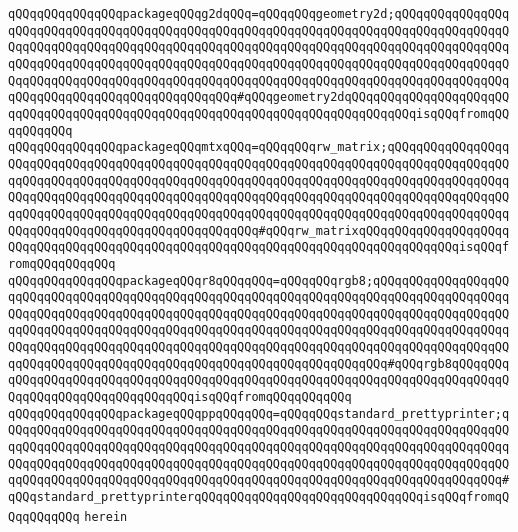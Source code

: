 \verb|qQQqqQQqqQQqqQQqpackageqQQqg2dqQQq=qQQqqQQqgeometry2d;qQQqqQQqqQQqqQQqqQQqqQQqqQQqqQQqqQQqqQQqqQQqqQQqqQQqqQQqqQQqqQQqqQQqqQQqqQQqqQQqqQQqqQQqqQQqqQQqqQQqqQQqqQQqqQQqqQQqqQQqqQQqqQQqqQQqqQQqqQQqqQQqqQQqqQQqqQQqqQQqqQQqqQQqqQQqqQQqqQQqqQQqqQQqqQQqqQQqqQQqqQQqqQQqqQQqqQQqqQQqqQQqqQQqqQQqqQQqqQQqqQQqqQQqqQQqqQQqqQQqqQQqqQQqqQQqqQQqqQQqqQQqqQQqqQQqqQQqqQQqqQQqqQQqqQQqqQQqqQQqqQQqqQQq#qQQqgeometry2dqQQqqQQqqQQqqQQqqQQqqQQqqQQqqQQqqQQqqQQqqQQqqQQqqQQqqQQqqQQqqQQqqQQqqQQqqQQqqQQqisqQQqfromqQQqqQQqqQQq|\newline
\verb|qQQqqQQqqQQqqQQqpackageqQQqmtxqQQq=qQQqqQQqrw_matrix;qQQqqQQqqQQqqQQqqQQqqQQqqQQqqQQqqQQqqQQqqQQqqQQqqQQqqQQqqQQqqQQqqQQqqQQqqQQqqQQqqQQqqQQqqQQqqQQqqQQqqQQqqQQqqQQqqQQqqQQqqQQqqQQqqQQqqQQqqQQqqQQqqQQqqQQqqQQqqQQqqQQqqQQqqQQqqQQqqQQqqQQqqQQqqQQqqQQqqQQqqQQqqQQqqQQqqQQqqQQqqQQqqQQqqQQqqQQqqQQqqQQqqQQqqQQqqQQqqQQqqQQqqQQqqQQqqQQqqQQqqQQqqQQqqQQqqQQqqQQqqQQqqQQqqQQqqQQqqQQqqQQqqQQqqQQq#qQQqrw_matrixqQQqqQQqqQQqqQQqqQQqqQQqqQQqqQQqqQQqqQQqqQQqqQQqqQQqqQQqqQQqqQQqqQQqqQQqqQQqqQQqqQQqisqQQqfromqQQqqQQqqQQq|\newline
\verb|qQQqqQQqqQQqqQQqpackageqQQqr8qQQqqQQq=qQQqqQQqrgb8;qQQqqQQqqQQqqQQqqQQqqQQqqQQqqQQqqQQqqQQqqQQqqQQqqQQqqQQqqQQqqQQqqQQqqQQqqQQqqQQqqQQqqQQqqQQqqQQqqQQqqQQqqQQqqQQqqQQqqQQqqQQqqQQqqQQqqQQqqQQqqQQqqQQqqQQqqQQqqQQqqQQqqQQqqQQqqQQqqQQqqQQqqQQqqQQqqQQqqQQqqQQqqQQqqQQqqQQqqQQqqQQqqQQqqQQqqQQqqQQqqQQqqQQqqQQqqQQqqQQqqQQqqQQqqQQqqQQqqQQqqQQqqQQqqQQqqQQqqQQqqQQqqQQqqQQqqQQqqQQqqQQqqQQqqQQqqQQqqQQqqQQqqQQqqQQq#qQQqrgb8qQQqqQQqqQQqqQQqqQQqqQQqqQQqqQQqqQQqqQQqqQQqqQQqqQQqqQQqqQQqqQQqqQQqqQQqqQQqqQQqqQQqqQQqqQQqqQQqqQQqqQQqisqQQqfromqQQqqQQqqQQq|\newline
\verb|qQQqqQQqqQQqqQQqpackageqQQqppqQQqqQQq=qQQqqQQqstandard_prettyprinter;qQQqqQQqqQQqqQQqqQQqqQQqqQQqqQQqqQQqqQQqqQQqqQQqqQQqqQQqqQQqqQQqqQQqqQQqqQQqqQQqqQQqqQQqqQQqqQQqqQQqqQQqqQQqqQQqqQQqqQQqqQQqqQQqqQQqqQQqqQQqqQQqqQQqqQQqqQQqqQQqqQQqqQQqqQQqqQQqqQQqqQQqqQQqqQQqqQQqqQQqqQQqqQQqqQQqqQQqqQQqqQQqqQQqqQQqqQQqqQQqqQQqqQQqqQQqqQQqqQQqqQQqqQQqqQQqqQQqqQQq#qQQqstandard_prettyprinterqQQqqQQqqQQqqQQqqQQqqQQqqQQqqQQqisqQQqfromqQQqqQQqqQQq|\newline
\verb|herein|\newline
